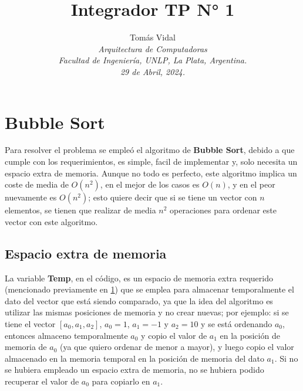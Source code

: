 \documentclass[letterpaper, 10 pt, conference]{ieeeconf}  %
\title{\LARGE \bf Integrador TP N° 1}
\author{
  Tom\'as Vidal\\
  {\it Arquitectura de Computadoras}\\
  {\it Facultad de Ingenier\'ia, UNLP, La Plata, Argentina.}\\
  {\it 29 de Abril, 2024.}
}                                            %
\begin{document}
\maketitle
\thispagestyle{empty}
\pagestyle{empty}


\section{Bubble Sort} \label{sec:bubble_sort}
Para resolver el problema se empleó el algoritmo de \textbf{Bubble Sort}, debido a que cumple con los requerimientos, es simple, facil de implementar y, solo necesita un espacio extra de memoria. Aunque no todo es perfecto, este algoritmo implica un coste de media de $O(n^{2})$, en el mejor de los casos es $O(n)$, y en el peor nuevamente es $O(n^{2})$; esto quiere decir que si se tiene un vector con $n$ elementos, se tienen que realizar de media $n^{2}$ operaciones para ordenar este vector con este algoritmo.

\subsection{Espacio extra de memoria}
La variable \textbf{Temp}, en el código, es un espacio de memoria extra requerido (mencionado previamente en \ref{sec:bubble_sort}) que se emplea para almacenar temporalmente el dato del vector que está siendo comparado, ya que la idea del algoritmo es utilizar las mismas posiciones de memoria y no crear nuevas; por ejemplo: si se tiene el vector $[a_0, a_1, a_2]$, $a_0=1$, $a_1=-1$ y $a_2=10$ y se está ordenando $a_0$, entonces almaceno temporalmente $a_0$ y copio el valor de $a_1$ en la posición de memoria de $a_0$ (ya que quiero ordenar de menor a mayor), y luego copio el valor almacenado en la memoria temporal en la posición de memoria del dato $a_1$. Si no se hubiera empleado un espacio extra de memoria, no se hubiera podido recuperar el valor de $a_0$ para copiarlo en $a_1$.
\end{document}
